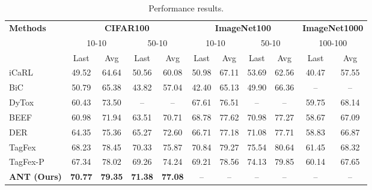 \documentclass[letterpaper]{article} %
\begin{document}
\begin{table}[!t]
  \centering
  \caption{Performance results.}
  \label{tab:perf_results}
  \setlength{\tabcolsep}{5pt}  %
  \begin{tabular}{l*{10}{c}}
    \toprule
    \multirow{3}{*}{\textbf{Methods}} &
      \multicolumn{4}{c}{\textbf{CIFAR100}} &
      \multicolumn{4}{c}{\textbf{ImageNet100}} &
      \multicolumn{2}{c}{\textbf{ImageNet1000}} \\ \cmidrule(lr){2-5}\cmidrule(lr){6-9}\cmidrule(lr){10-11}
    & \multicolumn{2}{c}{10-10} & \multicolumn{2}{c}{50-10}
    & \multicolumn{2}{c}{10-10} & \multicolumn{2}{c}{50-10}
    & \multicolumn{2}{c}{100-100} \\ \cmidrule(lr){2-3}\cmidrule(lr){4-5}\cmidrule(lr){6-7}\cmidrule(lr){8-9}\cmidrule(lr){10-11}
    & Last & Avg & Last & Avg & Last & Avg & Last & Avg & Last & Avg \\
    \midrule
    iCaRL~\cite{Rebuffi:2007}   & 49.52 & 64.64 & 50.56 & 60.08 & 50.98 & 67.11 & 53.69 & 62.56 & 40.47 & 57.55 \\
    BiC~\cite{Wu:2019}     & 50.79 & 65.38 & 43.82 & 57.04 & 42.40 & 65.13 & 49.90 & 66.36 & --    & --    \\
    DyTox~\cite{Douillard:2022}   & 60.43 & 73.50 & --    & --    & 67.61 & 76.51 & --    & --    & 59.75 & 68.14 \\
    BEEF~\cite{Wang:2023}    & 60.98 & 71.94 & 63.51 & 70.71 & 68.78 & 77.62 & 70.98 & 77.27 & 58.67 & 67.09 \\
    DER~\cite{Yan:2021}     & 64.35 & 75.36 & 65.27 & 72.60 & 66.71 & 77.18 & 71.08 & 77.71 & 58.83 & 66.87 \\
    TagFex \cite{zheng2025task}            & 68.23 & 78.45 & 70.33 & 75.87 & 70.84 & 79.27 & 75.54 & 80.64 & 61.45 & 68.32 \\
    TagFex-P \cite{zheng2025task}          & 67.34 & 78.02 & 69.26 & 74.24 & 69.21 & 78.56 & 74.13 & 79.85 & 60.14 & 67.65 \\
    \midrule
    \textbf{ANT (Ours)}                    & \textbf{70.77} & \textbf{79.35} & \textbf{71.38} & \textbf{77.08} & -- & -- & -- & -- & -- & -- \\
    \bottomrule
  \end{tabular}
\end{table}
\end{document}
